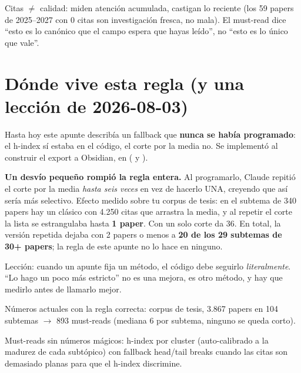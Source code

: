 \documentclass[11pt,a4paper]{article}
\begin{document}
\begin{ojo}
Citas $\neq$ calidad: miden atención acumulada, castigan lo reciente (los 59 papers de
2025--2027 con 0 citas son investigación fresca, no mala). El must-read dice ``esto es
lo canónico que el campo espera que hayas leído'', no ``esto es lo único que vale''.
\end{ojo}

\section{Dónde vive esta regla (y una lección de 2026-08-03)}

Hasta hoy este apunte describía un fallback que \textbf{nunca se había programado}: el
h-index sí estaba en el código, el corte por la media no. Se implementó al construir el
export a Obsidian, en  ( y
).

\begin{ojo}
\textbf{Un desvío pequeño rompió la regla entera.} Al programarlo, Claude repitió el corte
por la media \emph{hasta seis veces} en vez de hacerlo UNA, creyendo que así sería más
selectivo. Efecto medido sobre tu corpus de tesis: en el subtema de 340 papers hay un
clásico con 4.250 citas que arrastra la media, y al repetir el corte la lista se
estrangulaba hasta \textbf{1 paper}. Con un solo corte da 36. En total, la versión repetida
dejaba con 2 papers o menos a \textbf{20 de los 29 subtemas de 30+ papers}; la regla de
este apunte no lo hace en ninguno.

Lección: cuando un apunte fija un método, el código debe seguirlo \emph{literalmente}.
``Lo hago un poco más estricto'' no es una mejora, es otro método, y hay que medirlo
antes de llamarlo mejor.
\end{ojo}

Números actuales con la regla correcta: corpus de tesis, 3.867 papers en 104 subtemas
$\rightarrow$ 893 must-reads (mediana 6 por subtema, ninguno se queda corto).

\begin{resumen}
Must-reads sin números mágicos: h-index por cluster (auto-calibrado a la madurez de cada
subtópico) con fallback head/tail breaks cuando las citas son demasiado planas para que
el h-index discrimine.
\end{resumen}
\end{document}
